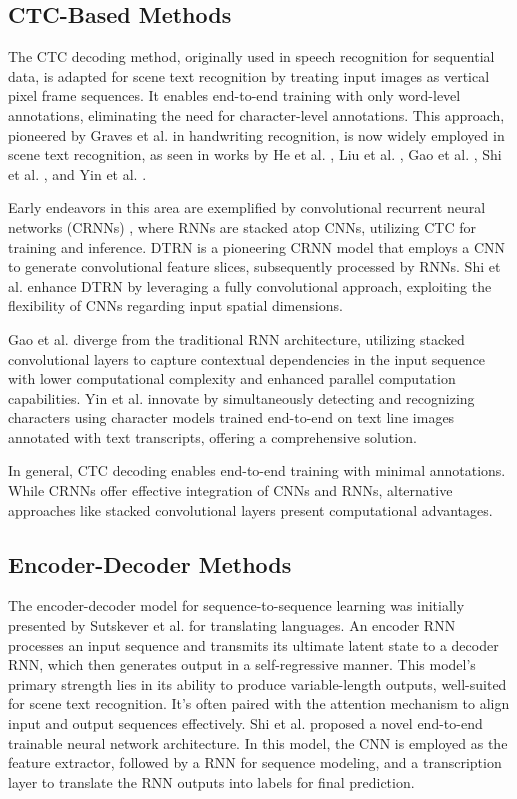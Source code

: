 \documentclass[12pt,twoside]{report}
\begin{document}
\subsection{CTC-Based Methods}
The CTC decoding method, originally used in speech recognition for sequential data, is adapted for scene text recognition by treating input images as vertical pixel frame sequences. It enables end-to-end training with only word-level annotations, eliminating the need for character-level annotations. This approach, pioneered by Graves et al. \cite{graves2008novel} in handwriting recognition, is now widely employed in scene text recognition, as seen in works by He et al. \cite{he2016reading}, Liu et al. \cite{liu2016star}, Gao et al. \cite{gao2017reading}, Shi et al. \cite{shi2016end}, and Yin et al. \cite{yin2017scene}.

Early endeavors in this area are exemplified by convolutional recurrent neural networks (CRNNs) \cite{shi2016end}, where RNNs are stacked atop CNNs, utilizing CTC for training and inference. DTRN \cite{he2016dtrn} is a pioneering CRNN model that employs a CNN to generate convolutional feature slices, subsequently processed by RNNs. Shi et al. \cite{shi2016end} enhance DTRN by leveraging a fully convolutional approach, exploiting the flexibility of CNNs regarding input spatial dimensions.

Gao et al. \cite{gao2017reading} diverge from the traditional RNN architecture, utilizing stacked convolutional layers to capture contextual dependencies in the input sequence with lower computational complexity and enhanced parallel computation capabilities. Yin et al. \cite{yin2017scene} innovate by simultaneously detecting and recognizing characters using character models trained end-to-end on text line images annotated with text transcripts, offering a comprehensive solution.

In general, CTC decoding enables end-to-end training with minimal annotations. While CRNNs offer effective integration of CNNs and RNNs, alternative approaches like stacked convolutional layers present computational advantages.

\subsection{Encoder-Decoder Methods}
The encoder-decoder model for sequence-to-sequence learning was initially presented by Sutskever et al. \cite{sutskever2014encoder} for translating languages. An encoder RNN processes an input sequence and transmits its ultimate latent state to a decoder RNN, which then generates output in a self-regressive manner. This model's primary strength lies in its ability to produce variable-length outputs, well-suited for scene text recognition. It's often paired with the attention mechanism \cite{bahdanau2014attention} to align input and output sequences effectively. Shi et al. \cite{shi2015convolutional} proposed a novel end-to-end trainable neural network architecture. In this model, the CNN is employed as the feature extractor, followed by a RNN for sequence modeling, and a transcription layer to translate the RNN outputs into labels for final prediction.
\end{document}
